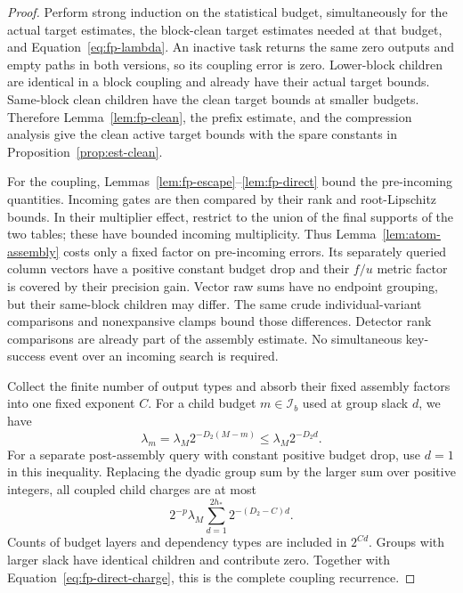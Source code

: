 \begin{proof}
Perform strong induction on the statistical budget, simultaneously for
the actual target estimates, the block-clean target estimates needed at
that budget, and Equation~\eqref{eq:fp-lambda}.  An inactive task returns
the same zero outputs and empty paths in both versions, so its coupling
error is zero.  Lower-block children are identical in a block coupling
and already have their actual target bounds.  Same-block clean children
have the clean target bounds at smaller budgets.  Therefore
Lemma~\ref{lem:fp-clean}, the prefix estimate, and the compression
analysis give the clean active target bounds with the spare constants
in Proposition~\ref{prop:est-clean}.

For the coupling, Lemmas~\ref{lem:fp-escape}--\ref{lem:fp-direct}
bound the pre-incoming quantities.  Incoming gates are then compared
by their rank and root-Lipschitz bounds.  In their multiplier effect,
restrict to the union of the final supports of the two tables; these
have bounded incoming multiplicity.  Thus Lemma~\ref{lem:atom-assembly}
costs only a fixed factor on pre-incoming errors.  Its separately queried
column vectors have a positive constant budget drop and their
$f/u$ metric factor is covered by their precision gain.  Vector raw
sums have no endpoint grouping, but their same-block children may
differ.  The same crude individual-variant comparisons and nonexpansive
clamps bound those differences.  Detector rank comparisons are already
part of the assembly estimate.  No simultaneous key-success event over
an incoming search is required.

Collect the finite number of output types and absorb their fixed
assembly factors into one fixed exponent $C$.  For a child budget
$m\in\mathcal I_b$ used at group slack $d$, we have
\begin{equation}
 \lambda_m=\lambda_M2^{-D_2(M-m)}
              \le\lambda_M2^{-D_2d}.
 \label{eq:fp-child-gain}
\end{equation}
For a separate post-assembly query with constant positive budget drop,
use $d=1$ in this inequality.  Replacing the dyadic group sum by the
larger sum over positive integers, all coupled child charges are at most
\begin{equation}
 2^{-p}\lambda_M\sum_{d=1}^{2h_*}2^{-(D_2-C)d}.
 \label{eq:fp-recurrence}
\end{equation}
Counts of budget layers and dependency types are included in $2^{C d}$.
Groups with larger slack have identical children and contribute zero.
Together with Equation~\eqref{eq:fp-direct-charge}, this is the complete
coupling recurrence.


\end{proof}
